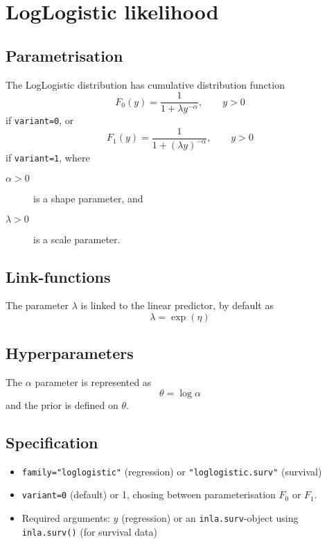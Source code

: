 \documentclass[a4paper,11pt]{article}
\begin{document}
\section*{LogLogistic likelihood}

\subsection*{Parametrisation}

The LogLogistic distribution has cumulative distribution function
\begin{displaymath}
    F_0(y) = \frac{1}{1 + \lambda y^{-\alpha}}, \qquad y > 0
\end{displaymath}
if \texttt{variant=0}, or
\begin{displaymath}
    F_1(y) = \frac{1}{1 + (\lambda y)^{-\alpha}}, \qquad y > 0
\end{displaymath}
if \texttt{variant=1}, where
\begin{description}
\item[$\alpha > 0$] is a shape parameter, and
\item[$\lambda > 0$] is a scale parameter.
\end{description}

\subsection*{Link-functions}

The parameter $\lambda$ is linked to the linear predictor, by default
as
\[
    \lambda = \exp(\eta)
\]

\subsection*{Hyperparameters}

The $\alpha$ parameter is represented as
\[
    \theta = \log\alpha
\]
and the prior is defined on $\theta$.

\subsection*{Specification}

\begin{itemize}
\item \texttt{family="loglogistic"} (regression) or
    \texttt{"loglogistic.surv"} (survival)
\item \texttt{variant=0} (default) or 1, chosing between
    parameterisation $F_0$ or $F_1$.
\item Required arguments: $y$ (regression) or an
    \texttt{inla.surv}-object using \texttt{inla.surv()} (for survival
    data)
\end{itemize}
\end{document}
